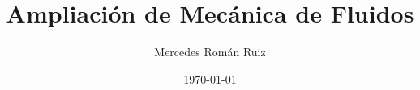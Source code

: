 \documentclass[10pt, a4paper, twoside, twocolumn]{book}
\title{Ampliación de Mecánica de Fluidos}
\author{Mercedes Román Ruiz}
\date{\today}
\theoremstyle{definition}
\begin{document}
\sloppy 
\setlength{\parindent}{30pt}
\setlength{\parskip}{6pt}
\renewcommand\thesection{\arabic{section}}
\renewcommand{\baselinestretch}{1.5}
\renewcommand{\listtablename}{Índice de tablas} %
\renewcommand{\tablename}{Tabla} %
\renewcommand{\baselinestretch}{1.5}

\fancyhead{}
\fancyfoot{}
\pagestyle{fancy}
\chead[\rightmark]{\leftmark}

\fancyfoot[LE,RO]{\thepage}

%

%

%



\end{document}
